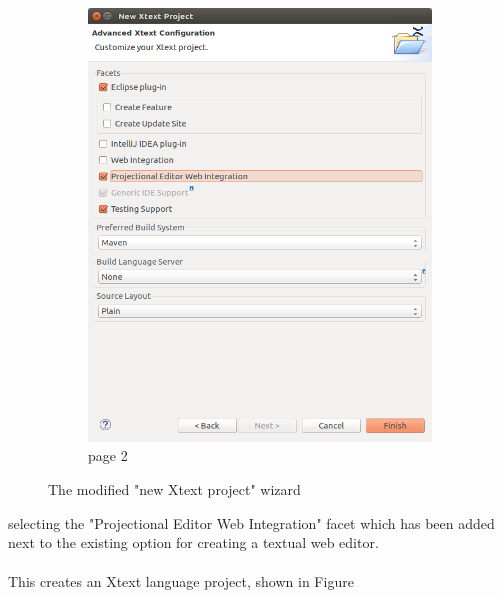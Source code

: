 \documentclass{article}
\begin{document}
\begin{figure}[t!]
\begin{subfigure}[b]{0.45\linewidth}
    \includegraphics[width=\linewidth]{./Screenshots/newXtextProjectPage2.png}
    \caption{page 2}
  \end{subfigure}
  \caption{The modified "new Xtext project" wizard}
  \label{fig:newProjectWiz}
\end{figure}
selecting the "Projectional Editor Web Integration" facet which has been added next to the existing option for creating a textual web editor.
\\
\\
This creates an Xtext language project, shown in Figure
\end{document}

